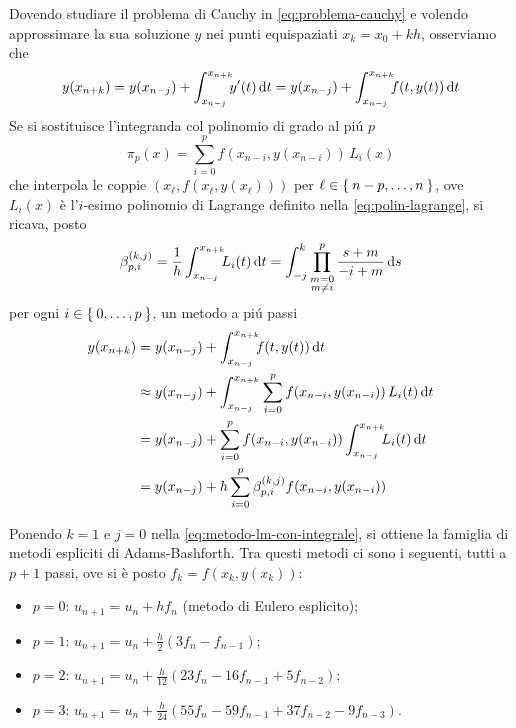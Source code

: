 	Dovendo studiare il problema di Cauchy in \eqref{eq:problema-cauchy} e volendo approssimare la sua soluzione \(y\) nei punti equispaziati \(x_k = x_0 + k h\), osserviamo che
	\begin{equation*}
		y (x_{n + k}) = y (x_{n - j}) + \int_{x_{n - j}}^{\mathrlap{x_{n + k}}} y' (t) \dd{t} = y (x_{n - j}) + \int_{x_{n - j}}^{\mathrlap{x_{n + k}}} f (t, y (t)) \dd{t}
	\end{equation*}
	Se si sostituisce l'integranda col polinomio di grado al piú \(p\)
	\begin{equation*}
		\pi_p (x) = \sum_{i = 0}^p f (x_{n - i}, y (x_{n - i})) \, L_i (x)
	\end{equation*}
	che interpola le coppie \((x_\ell, f(x_\ell, y (x_\ell)))\) per \(\ell \in \Set{n - p, \dots, n}\), ove \(L_i (x)\) è l'\(i\)-esimo polinomio di Lagrange definito nella \eqref{eq:polin-lagrange}, si ricava, posto
	\begin{equation}\label{eq:metodo-lm-beta}
		\beta_{p, i}^{(k, j)} = \frac{1}{h} \int_{x_{n - j}}^{\mathrlap{x_{n + k}}} L_i (t) \dd{t} = \int_{- j}^k \prod_{\substack{m = 0 \\ m \ne i}}^p \frac{s + m}{-i + m} \dd{s}
	\end{equation}
	per ogni \(i \in \Set{0, \dots, p}\), un metodo  a piú passi
	\begin{equation}\label{eq:metodo-lm-con-integrale}
		\begin{split}
			y (x_{n + k}) &= y (x_{n - j}) + \int_{x_{n - j}}^{\mathrlap{x_{n + k}}} f (t, y (t)) \dd{t} \\
			&\approx y (x_{n - j}) + \int_{x_{n - j}}^{x_{n + k}} \sum_{i = 0}^p f (x_{n - i}, y (x_{n - i})) \, L_i (t) \dd{t} \\
			&= y (x_{n - j}) + \sum_{i = 0}^p f (x_{n - i}, y (x_{n - i})) \int_{x_{n - j}}^{\mathrlap{x_{n + k}}} L_i (t) \dd{t} \\
			&= y (x_{n - j}) + h \sum_{i = 0}^p \beta_{p, i}^{(k, j)} f (x_{n - i}, y (x_{n - i}))
		\end{split}
	\end{equation}

	\begin{esempio}
		Ponendo \(k = 1\) e \(j = 0\) nella \eqref{eq:metodo-lm-con-integrale}, si ottiene la famiglia di metodi espliciti di Adams-Bashforth. Tra questi metodi ci sono i seguenti, tutti a \(p + 1\) passi, ove si è posto \(f_k = f (x_k, y (x_k))\):
		\begin{itemize}
			\item \(p = 0\): \(u_{n + 1} = u_n + h f_n\) (metodo di Eulero esplicito);
			\item \(p = 1\): \(u_{n + 1} = u_n + \frac{h}{2} (3 f_n - f_{n - 1})\);
			\item \(p = 2\): \(u_{n + 1} = u_n + \frac{h}{12} (23 f_n - 16 f_{n - 1} + 5 f_{n - 2})\);
			\item \(p = 3\): \(u_{n + 1} = u_n + \frac{h}{24} (55 f_n - 59 f_{n - 1} + 37 f_{n - 2} - 9 f_{n - 3})\).
		\end{itemize}
	\end{esempio}

